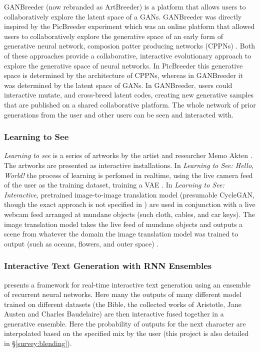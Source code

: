 GANBreeder (now rebranded as ArtBreeder) \citep{simon2020artbreeder} is a platform that allows users to collaboratively explore the latent space of a GANs.
GANBreeder was directly inspired by the PicBreeder experiment \citep{secretan2008picbreeder,secretan2011picbreeder} which was an online platform that allowed users to collaboratively explore the generative space of an early form of generative neural network, composion patter producing networks (CPPNs) \citep{stanley2007compositional}.
Both of these approaches provide a collaborative, interactive evolutionary approach to explore the generative space of neural networks. 
In PicBreeder this generative space is determined by the architecture of CPPNs, whereas in GANBreeder it was determined by the latent space of GANs.
In GANBreeder, users could interactive mutate, and cross-breed latent codes, creating new generative samples that are published on a shared collaborative platform.
The whole network of prior generations from the user and other users can be seen and interacted with.

\subsubsection{Learning to See}

\textit{Learning to see} is a series of artworks by the artist and researcher Memo Akten \citep{akten2019learning, celis2021memo}.
The artworks are presented as interactive installations.
In \textit{Learning to See: Hello, World!} the process of learning is perfomed in realtime, using the live camera feed of the user as the training dataset, training a VAE \citep{akten2017hello}.
In  \textit{Learning to See: Interactive}, pretrained image-to-image translation model (presumable CycleGAN, though the exact approach is not specified in \citep{akten2019learning}) are used in conjunction with a live webcam feed arranged at mundane objects (such cloth, cables, and car keys).
The image translation model takes the live feed of mundane objects and outputs a scene from whatever the domain the image translation model was trained to output (such as oceans, flowers, and outer space) \citep{akten2017interactive}.

\subsubsection{Interactive Text Generation with RNN Ensembles}

\cite{akten2016real} presents a framework for real-time interactive text generation using an ensemble of recurrent neural networks. 
Here many the outputs of many different model trained on different datasets (the Bible, the collected works of Aristotle, Jane Austen and Charles Baudelaire) are then interactive fused together in a generative ensemble.
Here the probability of outputs for the next character are interpolated based on the specified mix by the user (this project is also detailed in \S \ref{survey:blending}).

